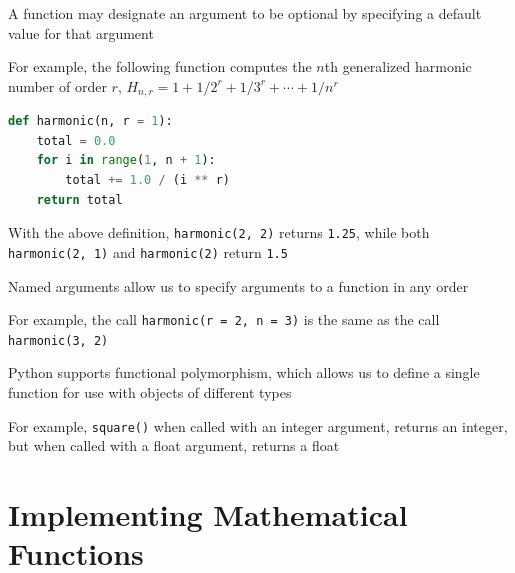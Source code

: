 \documentclass[8pt,a4paper,compress]{beamer}
\begin{document}
\begin{frame}[fragile]
\pause

A function may designate an argument to be optional by specifying a default value for that argument

\pause
\bigskip

For example, the following function computes the $n$th generalized harmonic number of order $r$, $H_{n,r}=1+1/2^r+1/3^r+\cdots+1/n^r$

\begin{lstlisting}[language=Python]
def harmonic(n, r = 1):
    total = 0.0
    for i in range(1, n + 1):
        total += 1.0 / (i ** r)
    return total
\end{lstlisting}
With the above definition, \lstinline{harmonic(2, 2)} returns \lstinline{1.25}, while both \lstinline{harmonic(2, 1)} and \lstinline{harmonic(2)} return \lstinline{1.5}

\pause
\bigskip

Named arguments allow us to specify arguments to a function in any order

\pause
\bigskip

For example, the call \lstinline{harmonic(r = 2, n = 3)} is the same as the call \lstinline{harmonic(3, 2)}

\pause
\bigskip

Python supports functional polymorphism, which allows us to define a single function for use with objects of different types

\pause
\bigskip

For example, \lstinline{square()} when called with an integer argument, returns an integer, but when called with a float argument, returns a float
\end{frame}

\section{Implementing Mathematical Functions}
\end{document}
